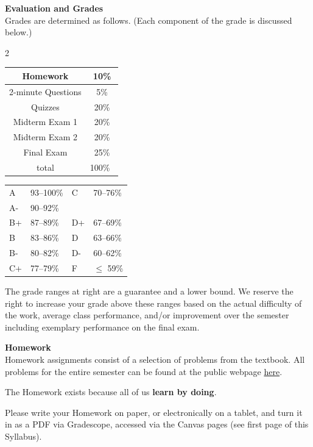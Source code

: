 \documentclass[12pt]{article}
\renewcommand{\emph}[1]{\textsf{\textbf{#1}}}
\newcommand{\localhead}[1]{\par\smallskip\textbf{#1} \smallskip\nobreak\\}%
\def\heading#1{\localhead{\large\emph{#1}}}
\begin{document}
\heading{Evaluation and Grades}
Grades are determined as follows.  (Each component of the grade is discussed below.)
 
\begin{multicols}{2}
\begin{tabular}{|c|c|}
\hline
Homework & 10\% \\
\hline
2-minute Questions & 5\% \\
\hline
Quizzes & 20\% \\
\hline
Midterm Exam 1 & 20\% \\
\hline
Midterm Exam 2 & 20\%  \\
\hline
Final Exam & 25\% \\
\hline
total & 100\% \, \\
\hline
\end{tabular}


\begin{tabular}{llll}
A  & 93--100\%& C  & 70--76\%  \\
A- & 90--92\% & &  \\
B+ & 87--89\% & D+ & 67--69\%  \\
B  & 83--86\% & D  & 63--66\%  \\
B- & 80--82\% & D- & 60--62\%  \\
C+ & 77--79\% & F  & $\le$ 59\%
\end{tabular}
\end{multicols}

The grade ranges at right are a guarantee and a lower bound. We reserve the right to increase your grade above these ranges based on the actual difficulty of the work, average class performance, and/or improvement over the semester including exemplary performance on the final exam. \\

\clearpage\newpage
\phantom{x}
\vspace{-4mm}

\heading{Homework}
Homework assignments consist of a selection of problems from the textbook.  All problems for the entire semester can be found at the public webpage \href{https://uaf-math.github.io/calc2/homework.html}{here}. 

The Homework exists because all of us \textbf{learn by doing}.

Please write your Homework on paper, or electronically on a tablet, and turn it in as a PDF via Gradescope, accessed via the Canvas pages (see first page of this Syllabus).  
\end{document}
